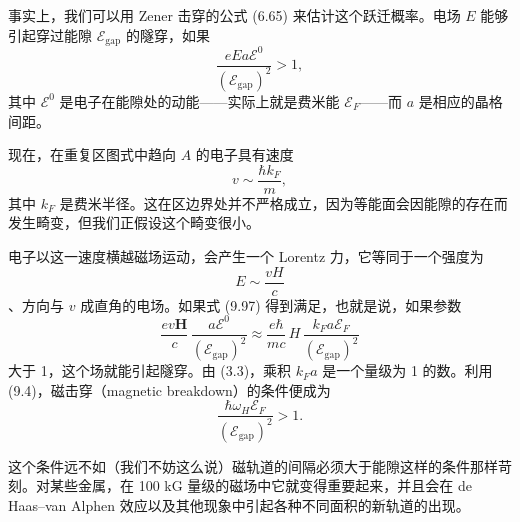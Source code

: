 事实上，我们可以用 Zener 击穿的公式 (6.65) 来估计这个跃迁概率。电场 $E$ 能够引起穿过能隙 $\mathcal{E}_{\mathrm{gap}}$ 的隧穿，如果
\begin{equation*}
\frac{eEa\mathcal{E}^{0}}{(\mathcal{E}_{\mathrm{gap}})^{2}}>1,
\tag{9.97}
\end{equation*}
其中 $\mathcal{E}^{0}$ 是电子在能隙处的动能——实际上就是费米能 $\mathcal{E}_{F}$——而 $a$ 是相应的晶格间距。

现在，在重复区图式中趋向 $A$ 的电子具有速度
\begin{equation*}
v\sim\frac{\hbar k_{F}}{m},
\tag{9.98}
\end{equation*}
其中 $k_{F}$ 是费米半径。这在区边界处并不严格成立，因为等能面会因能隙的存在而发生畸变，但我们正假设这个畸变很小。

电子以这一速度横越磁场运动，会产生一个 Lorentz 力，它等同于一个强度为
\begin{equation*}
E\sim\frac{vH}{c}
\tag{9.99}
\end{equation*}
、方向与 $v$ 成直角的电场。如果式 (9.97) 得到满足，也就是说，如果参数
\begin{equation*}
\frac{ev\mathbf{H}}{c}\,\frac{a\mathcal{E}^{0}}{(\mathcal{E}_{\mathrm{gap}})^{2}}\approx\frac{e\hbar}{mc}\,H\,\frac{k_{F}a\mathcal{E}_{F}}{(\mathcal{E}_{\mathrm{gap}})^{2}}
\tag{9.100}
\end{equation*}
大于 1，这个场就能引起隧穿。由 (3.3)，乘积 $k_{F}a$ 是一个量级为 1 的数。利用 (9.4)，磁击穿（magnetic breakdown）的条件便成为
\begin{equation*}
\frac{\hbar\omega_{H}\mathcal{E}_{F}}{(\mathcal{E}_{\mathrm{gap}})^{2}}>1.
\tag{9.101}
\end{equation*}

这个条件远不如（我们不妨这么说）磁轨道的间隔必须大于能隙这样的条件那样苛刻。对某些金属，在 100 kG 量级的磁场中它就变得重要起来，并且会在 de Haas--van Alphen 效应以及其他现象中引起各种不同面积的新轨道的出现。
